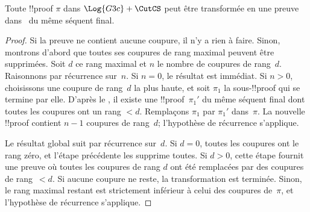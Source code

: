 \documentclass[../../../include/open-logic-section]{subfiles}
\begin{document}
\begin{thm}
Toute !!{proof} $\pi$ dans $\Log{G3c}+\CutCS$ peut être
transformée en une preuve dans~ du même séquent final.
\end{thm}

\begin{proof}
Si la preuve ne contient aucune coupure, il n'y a rien à faire.
Sinon, montrons d'abord que toutes ses coupures de rang maximal
peuvent être supprimées.
Soit $d$ ce rang maximal et $n$ le nombre de coupures de rang~$d$.
Raisonnons par récurrence sur~$n$.
Si $n=0$, le résultat est immédiat.
Si $n>0$, choisissons une coupure de rang~$d$ la plus haute,
et soit $\pi_1$ la sous-!!{proof} qui se termine par elle.
D'après le , il existe une
!!{proof}~$\pi_1'$ du même séquent final dont toutes les
coupures ont un rang $<d$. Remplaçons $\pi_1$ par $\pi_1'$
dans~$\pi$. La nouvelle !!{proof} contient $n-1$ coupures
de rang~$d$; l'hypothèse de récurrence s'applique.

Le résultat global suit par récurrence sur~$d$.
Si $d=0$, toutes les coupures ont le rang zéro, et l'étape
précédente les supprime toutes.
Si $d>0$, cette étape fournit une preuve où toutes les
coupures de rang $d$ ont été remplacées par des coupures
de rang~$<d$. Si aucune coupure ne reste, la transformation
est terminée. Sinon, le rang maximal restant est strictement
inférieur à celui des coupures de~$\pi$, et l'hypothèse
de récurrence s'applique.
\end{proof}
\end{document}

